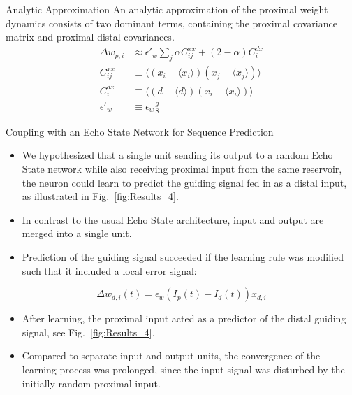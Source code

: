 \documentclass{beamer}
\newcommand{\avg}[1]{\langle #1 \rangle}
\begin{document}
\begin{frame}[t]
\begin{columns}[t]
\begin{column}{.5\textwidth}
\begin{myblock}{Analytic Approximation}
An analytic approximation of the proximal weight dynamics consists of two dominant terms, containing the proximal covariance matrix and proximal-distal covariances.
\begin{align*}
\Delta w_{p,i} &\approx \epsilon'_w \sum_j \alpha C^{xx}_{ij} + (2-\alpha) C^{dx}_i \\
C^{xx}_{ij} &\equiv \avg{\left(x_i - \avg{x_i} \right)\left( x_j - \avg{x_j} \right)} \\
C^{dx}_i &\equiv \avg{\left(d - \avg{d} \right) \left(x_i - \avg{x_i} \right)} \\
\epsilon'_w &\equiv \epsilon_w \frac{g}{8}
\end{align*}
\end{myblock}

\begin{myblock}{Coupling with an Echo State Network for Sequence Prediction}
\begin{itemize}
\item We hypothesized that a single unit sending its output to a random Echo State network while also receiving proximal input from the same reservoir, the neuron could learn to predict the guiding signal fed in as a distal input, as illustrated in Fig.~\ref{fig:Results_4}.
\item In contrast to the usual Echo State architecture, input and output are merged into a single unit.
\item Prediction of the guiding signal succeeded if the learning rule was modified such that it included a local error signal:
\end{itemize}
\begin{equation*}
\Delta w_{d,i}(t) = \epsilon_w \left(I_p(t)-I_d(t)\right) x_{d,i}
\end{equation*}
\begin{itemize}
\item After learning, the proximal input acted as a predictor of the distal guiding signal, see Fig.~\ref{fig:Results_4}.
\item Compared to separate input and output units, the convergence of the learning process was prolonged, since the input signal was disturbed by the initially random proximal input.
\end{itemize}
\end{myblock}







\end{column}
\end{columns}
\end{frame}
\end{document}
